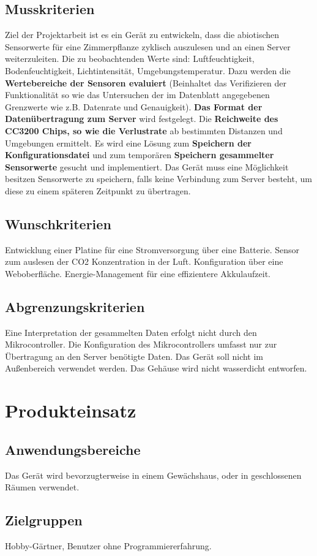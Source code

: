 \documentclass[pointlessnumbers]{scrartcl}
\begin{document}
\subsection{Musskriterien}
        Ziel der Projektarbeit ist es ein Gerät zu entwickeln, dass die abiotischen Sensorwerte für eine Zimmerpflanze zyklisch auszulesen und an einen Server weiterzuleiten. Die zu beobachtenden Werte sind: Luftfeuchtigkeit, Bodenfeuchtigkeit, Lichtintensität, Umgebungstemperatur.
        Dazu werden die \textbf{Wertebereiche der Sensoren evaluiert} (Beinhaltet das Verifizieren der Funktionalität so wie das Untersuchen der im Datenblatt angegebenen Grenzwerte wie z.B. Datenrate und Genauigkeit). \textbf{Das Format der Datenübertragung zum Server} wird festgelegt. Die \textbf{Reichweite des CC3200 Chips, so wie die Verlustrate} ab bestimmten Distanzen und Umgebungen ermittelt. 
    Es wird eine Lösung zum \textbf{Speichern der Konfigurationsdatei} und zum temporären \textbf{Speichern gesammelter Sensorwerte} gesucht und implementiert. Das Gerät muss eine Möglichkeit besitzen Sensorwerte zu speichern, falls keine Verbindung zum Server besteht, um diese zu einem späteren Zeitpunkt zu übertragen.
\subsection{Wunschkriterien}
    Entwicklung einer Platine für eine Stromversorgung über eine Batterie. Sensor zum auslesen der CO2 Konzentration in der Luft. Konfiguration über eine Weboberfläche. Energie-Management für eine effizientere Akkulaufzeit.
\subsection{Abgrenzungskriterien}
    Eine Interpretation der gesammelten Daten erfolgt nicht durch den Mikrocontroller.
    Die Konfiguration des Mikrocontrollers umfasst nur zur Übertragung an den Server benötigte Daten.
    Das Gerät soll nicht im Außenbereich verwendet werden. Das Gehäuse wird nicht wasserdicht entworfen.
\section{Produkteinsatz}
\subsection{Anwendungsbereiche}
    Das Gerät wird bevorzugterweise in einem Gewächshaus, oder in geschlossenen Räumen verwendet. 
\subsection{Zielgruppen}
    Hobby-Gärtner, Benutzer ohne Programmiererfahrung. 
\end{document}
